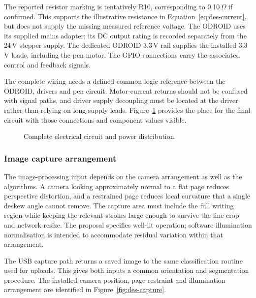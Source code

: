 The reported resistor marking is tentatively R10, corresponding to 0.10\,$\Omega$ if confirmed. This supports the illustrative resistance in Equation~\ref{eq:des-current}, but does not supply the missing measured reference voltage. The ODROID uses its supplied mains adapter; its DC output rating is recorded separately from the 24\,V stepper supply. The dedicated ODROID 3.3\,V rail supplies the installed 3.3\,V loads, including the pen motor. The GPIO connections carry the associated control and feedback signals.

The complete wiring needs a defined common logic reference between the ODROID, drivers and pen circuit. Motor-current returns should not be confused with signal paths, and driver supply decoupling must be located at the driver rather than relying on long supply leads. Figure~\ref{fig:des-complete-circuit} provides the place for the final circuit with those connections and component values visible.
\begin{figure}[!htbp]\centering
{}
\caption{Complete electrical circuit and power distribution.}
\label{fig:des-complete-circuit}
\end{figure}

\subsubsection{Image capture arrangement}
\label{sec:des-camera}
The image-processing input depends on the camera arrangement as well as the algorithms. A camera looking approximately normal to a flat page reduces perspective distortion, and a restrained page reduces local curvature that a single deskew angle cannot remove. The capture area must include the full writing region while keeping the relevant strokes large enough to survive the line crop and network resize. The proposal specifies well-lit operation; software illumination normalisation is intended to accommodate residual variation within that arrangement.

The USB capture path returns a saved image to the same classification routine used for uploads. This gives both inputs a common orientation and segmentation procedure. The installed camera position, page restraint and illumination arrangement are identified in Figure~\ref{fig:des-capture}.

